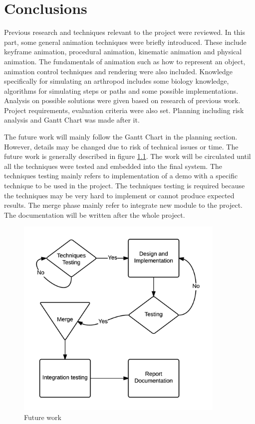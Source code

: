 \chapter{Conclusions}
Previous research and techniques relevant to the project were reviewed. In this part, some general animation techniques were briefly introduced. These include keyframe animation, procedural animation, kinematic animation and physical animation. The fundamentals of animation such as how to represent an object, animation control techniques and rendering were also included. Knowledge specifically for simulating an arthropod includes some biology knowledge, algorithms for simulating steps or paths and some possible implementations.
Analysis on possible solutions were given based on research of previous work. Project requirements, evaluation criteria were also set.  Planning including risk analysis and Gantt Chart was made after it.


The future work will mainly follow the Gantt Chart in the planning section. However, details may be changed due to risk of technical issues or time. The future work is generally described in figure \ref{fig:fw}. The work will be circulated until all the techniques were tested and embedded into the final system. The techniques testing mainly refers to implementation of a demo with a specific technique to be used in the project. The techniques testing is required because the techniques may be very hard to implement or cannot produce expected results. The merge phase mainly refer to integrate new module to the project. The documentation will be written after the whole project. 
\begin{figure}[ht!]
\centering
\includegraphics[width=10cm]{figures/fw.png}
\caption{Future work}
\label{fig:fw}
\end{figure}
